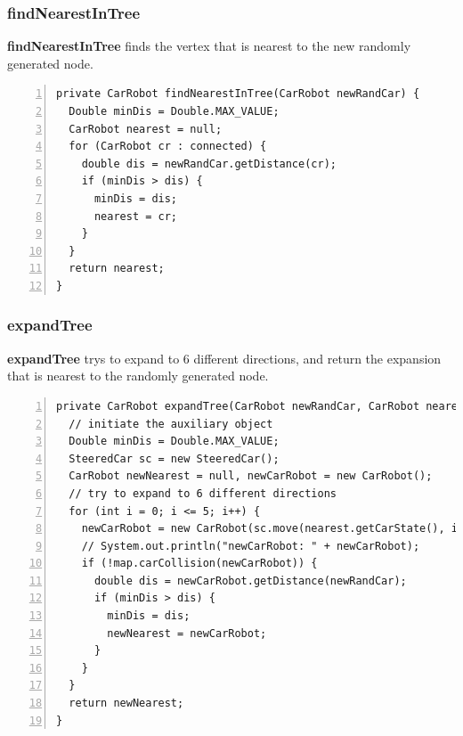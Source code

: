 \documentclass{article}
\begin{document}
\subsubsection{findNearestInTree}

\textbf{findNearestInTree} finds the vertex that is nearest to the new randomly generated node.

\begin{lstlisting}[numbers=left]
private CarRobot findNearestInTree(CarRobot newRandCar) {
  Double minDis = Double.MAX_VALUE;
  CarRobot nearest = null;
  for (CarRobot cr : connected) {
    double dis = newRandCar.getDistance(cr);
    if (minDis > dis) {
      minDis = dis;
      nearest = cr;
    }
  }
  return nearest;
}
\end{lstlisting}




\subsubsection{expandTree}

\textbf{expandTree} trys to expand to 6 different directions, and return the expansion that is nearest to the randomly generated node.

\begin{lstlisting}[numbers=left]
private CarRobot expandTree(CarRobot newRandCar, CarRobot nearest) {
  // initiate the auxiliary object
  Double minDis = Double.MAX_VALUE;
  SteeredCar sc = new SteeredCar();
  CarRobot newNearest = null, newCarRobot = new CarRobot();
  // try to expand to 6 different directions
  for (int i = 0; i <= 5; i++) {
    newCarRobot = new CarRobot(sc.move(nearest.getCarState(), i, 1.));
    // System.out.println("newCarRobot: " + newCarRobot);
    if (!map.carCollision(newCarRobot)) {
      double dis = newCarRobot.getDistance(newRandCar);
      if (minDis > dis) {
        minDis = dis;
        newNearest = newCarRobot;
      }
    }
  }
  return newNearest;
}

\end{lstlisting}
\end{document}
